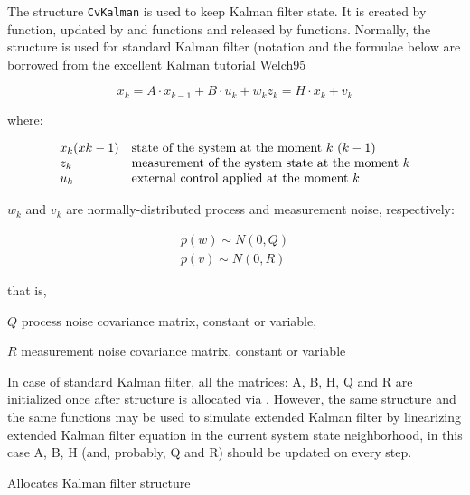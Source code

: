 The structure \texttt{CvKalman} is used to keep Kalman filter
state. It is created by  function, updated
by  and  functions
and released by  functions. Normally, the
structure is used for standard Kalman filter (notation and the
formulae below are borrowed from the excellent Kalman tutorial
Welch95

\[
x_k=A \cdot x_{k-1}+B \cdot u_k+w_k
z_k=H \cdot x_k+v_k
\]

where:

\[
\begin{array}{l l}
x_k (x{k-1}) & \text{state of the system at the moment $k$ $(k-1)$ }\\
z_k & \text{measurement of the system state at the moment $k$}\\
u_k & \text{external control applied at the moment $k$}
\end{array}
\]

$w_k$ and $v_k$ are normally-distributed process and measurement noise, respectively:

\[
\begin{array}{l}
p(w) \sim N(0,Q)\\
p(v) \sim N(0,R)
\end{array}
\]

that is,

$Q$ process noise covariance matrix, constant or variable,

$R$ measurement noise covariance matrix, constant or variable

In case of standard Kalman filter, all the matrices: A, B, H, Q and R are initialized once after  structure is allocated via . However, the same structure and the same functions may be used to simulate extended Kalman filter by linearizing extended Kalman filter equation in the current system state neighborhood, in this case A, B, H (and, probably, Q and R) should be updated on every step.

\label{CreateKalman}

Allocates Kalman filter structure


\begin{description}
\end{description}

